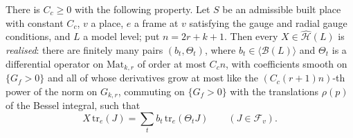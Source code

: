\begin{theorem}\label{pf:thmS-carrier:hatreal}
There is $C_c\ge0$ with the following property. Let $S$ be an admissible built place with constant $C_c$, $v$ a place, $e$ a
frame at $v$ satisfying the gauge and radial gauge conditions, and $L$ a model level; put $n=2r+k+1$. Then every
$X\in\widehat{\mathcal H}(L)$ is \emph{realised}: there are finitely many pairs $(b_t,\Theta_t)$, where
$b_t\in\langle\mathcal B(L)\rangle$ and $\Theta_t$ is a differential operator on $\mathrm{Mat}_{k,r}$ of order at most
$C_cn$, with coefficients smooth on $\{G_f>0\}$ and all of whose derivatives grow at most like the
$(C_c(r+1)n)$-th power of the norm on $G_{k,r}$, commuting on $\{G_f>0\}$ with the translations $\rho(p)$ of the Bessel
integral, such that
\begin{equation}\label{eq:pf:thmS-carrier:realised}
X\,\mathrm{tr}_e(J)=\sum_tb_t\,\mathrm{tr}_e(\Theta_tJ)\qquad(J\in\mathcal F_v).
\end{equation}
\end{theorem}

